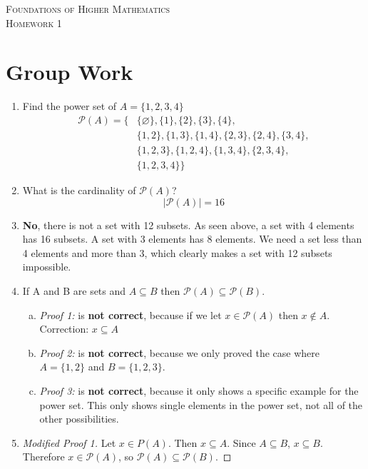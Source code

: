 \documentclass{article}
\let\emptyset\varnothing
\newcommand{\classname}{
Foundations of Higher Mathematics
}
\newcommand{\assignment}{
1
}
\begin{document}
\begin{center}
\textsc{\Large \classname}\\[.3cm]
\textsc{\Large Homework \assignment}
\end{center}


\section*{Group Work}
\begin{enumerate}
\item Find the power set of $A = \{1,2,3,4\}$
  \begin{align*}
    \mathcal{P}{(A)} = \{ 
    & \{ \emptyset \}, \{1\}, \{2\}, \{3\}, \{4\}, \\
    & \{1,2\}, \{1,3\}, \{1,4\}, \{2,3\}, \{2,4\}, \{3,4\}, \\
    & \{1,2,3\}, \{1,2,4\}, \{1,3,4\}, \{2,3,4\}, \\
    &\{1,2,3,4\} \}
  \end{align*}
\item What is the cardinality of $\mathcal{P}{(A)}$?
  $$ |\mathcal{P}{(A)}| = 16 $$
\item \textbf{No}, there is not a set with 12 subsets. As seen above, a set with 4 elements has 16 subsets. A set with 3 elements has 8 elements. We need a set less than 4 elements and more than 3, which clearly makes a set with 12 subsets impossible.
\item If A and B are sets and $A \subseteq B$ then $\mathcal{P}{(A)} \subseteq \mathcal{P}{(B)}$.
  \begin{enumerate}[a)] 
  \item \textit{Proof 1:} is \textbf{not correct}, because if we let $x \in \mathcal{P}{(A)}$ then $x \not \in A$. Correction: $x \subseteq A$
  \item \textit{Proof 2:} is \textbf{not correct}, because we only proved the case where $A = \{1,2\}$ and $B = \{1,2,3\}$.
  \item \textit{Proof 3:} is \textbf{not correct}, because it only shows a specific example for the power set. This only shows single elements in the power set, not all of the other possibilities.
  \end{enumerate}
\item \begin{proof}[Modified Proof 1] Let $x \in P(A)$. Then $x \subseteq A$. Since $A \subseteq B$, $x \subseteq B$. Therefore $x \in \mathcal{P}{(A)}$, so $\mathcal{P}{(A)} \subseteq \mathcal{P}{(B)}$. \end{proof}
\end{enumerate}
\end{document}
